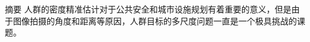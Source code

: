 \documentclass{article}
\begin{document}
摘要
人群的密度精准估计对于公共安全和城市设施规划有着重要的意义，但是由于图像拍摄的角度和距离等原因，人群目标的多尺度问题一直是一个极具挑战的课题。
\end{document}
